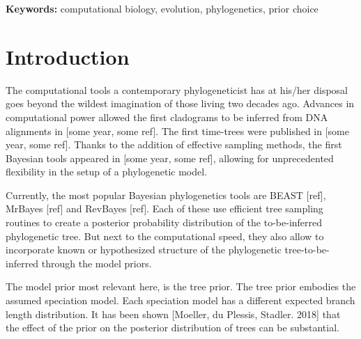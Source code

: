 \documentclass{article}
\begin{document}
\begin{abstract}


\end{abstract}

{\bf Keywords:} computational biology, evolution, phylogenetics, prior choice

\section{Introduction}

The computational tools a contemporary phylogeneticist has at his/her disposal
goes beyond the wildest imagination of those living two decades ago. 
Advances in computational power allowed the first cladograms to be inferred 
from DNA alignments in [some year, some ref]. The first time-trees were
published in [some year, some ref]. Thanks to the addition of effective sampling
methods, the first Bayesian tools appeared in [some year, some ref], allowing
for unprecedented flexibility in the setup of a phylogenetic model.

Currently, the most popular Bayesian phylogenetics tools are BEAST [ref],  
MrBayes [ref] and RevBayes [ref]. Each of these use efficient tree sampling 
routines to create a posterior probability distribution of the to-be-inferred 
phylogenetic tree. But next to the computational speed, they also allow
to incorporate known or hypothesized structure of the phylogenetic 
tree-to-be-inferred through the model priors.

The model prior most relevant here, is the tree prior. The tree prior
embodies the assumed speciation model. Each speciation model has a
different expected branch length distribution. It has been shown 
[Moeller, du Plessis, Stadler. 2018] that the effect of the prior on the posterior distribution 
of trees can be substantial. 
\end{document}
